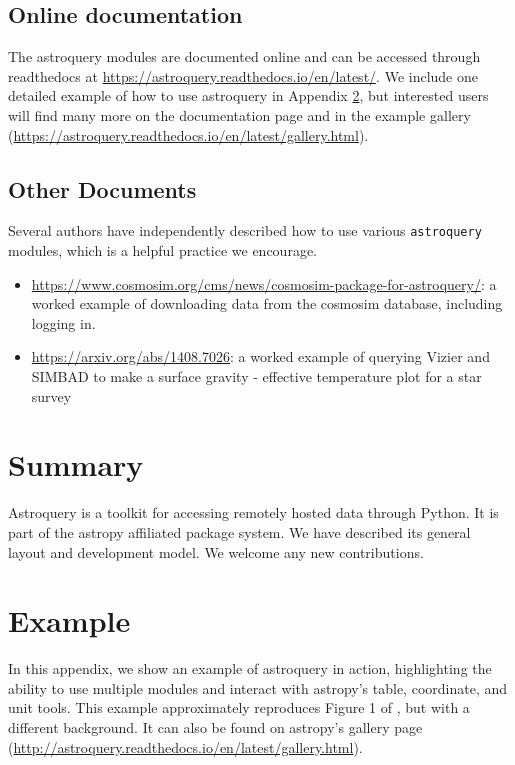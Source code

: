 \documentclass[twocolumn]{aastex61}
\newcommand{\package}[1]{\texttt{#1}\xspace}
\newcommand{\astroquery}{\package{astroquery}}
\begin{document}
\subsection{Online documentation}
The astroquery modules are documented online and can be accessed through
readthedocs at \url{https://astroquery.readthedocs.io/en/latest/}.
We include one detailed example of how to use astroquery in Appendix \ref{sec:example},
but interested users will find many more on the documentation page and 
in the example gallery (\url{https://astroquery.readthedocs.io/en/latest/gallery.html}).

\subsection{Other Documents}
Several authors have independently described how to use various \astroquery
modules, which is a helpful practice we encourage.

\begin{itemize}
    \item
        \url{https://www.cosmosim.org/cms/news/cosmosim-package-for-astroquery/}:
        a worked example of downloading data from the cosmosim database,
        including logging in.
    \item \url{https://arxiv.org/abs/1408.7026}: a worked example of querying
        Vizier and SIMBAD to make a surface gravity - effective temperature
        plot for a star survey
\end{itemize}

\section{Summary}
Astroquery is a toolkit for accessing remotely hosted data through Python.
It is part of the astropy affiliated package system.  
We have described its general layout and development model.
We welcome any new contributions.





\appendix
\section{Example}
\label{sec:example}
In this appendix, we show an example of astroquery in action, highlighting the
ability to use multiple modules and interact with astropy's table, coordinate,
and unit tools.  This example approximately reproduces Figure 1 of
\citet{Eisner2016a}, but with a different background.
It can also be found on astropy's gallery page (\url{http://astroquery.readthedocs.io/en/latest/gallery.html}).
\end{document}
